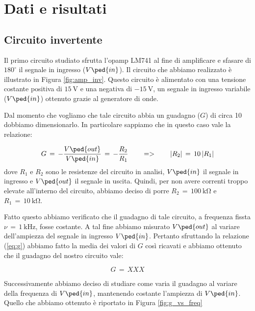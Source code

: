 \section*{Dati e risultati}

\subsection*{Circuito invertente}

Il primo circuito studiato sfrutta l'opamp LM741 al fine di amplificare e sfasare di $180^\circ$ il segnale in ingresso ($V\ped{in}$). Il circuito che abbiamo realizzato è illustrato in Figura \ref{fig:amp_inv}.
Questo circuito è alimentato con una tensione costante positiva di $\SI{+15}{\volt}$ e una negativa di $\SI{-15}{\volt}$, un segnale in ingresso variabile ($V\ped{in}$) ottenuto grazie al generatore di onde.

Dal momento che vogliamo che tale circuito abbia un guadagno ($G$) di circa 10 dobbiamo dimensionarlo. In particolare sappiamo che in questo caso vale la relazione:

\begin{equation}
        G\,=\,-\frac{V\ped{out}}{V\ped{in}}\,=\,-\frac{R_2}{R_1} \qquad => \qquad |R_2|\,=\,10\,|R_1|
        \label{eq:g}
\end{equation}
%
dove $R_1$ e $R_2$ sono le resistenze del circuito in analisi, $V\ped{in}$ il segnale in ingresso e $V\ped{out}$ il segnale in uscita. Quindi, per non avere correnti troppo elevate all'interno del circuito, abbiamo deciso di porre $R_2\,=\,\SI{100}{\kilo\ohm}$ e $R_1\,=\,\SI{10}{\kilo\ohm}$.

Fatto questo abbiamo verificato che il guadagno di tale circuito, a frequenza fissta $\nu\,=\,\SI{1}{\kilo\hertz}$, fosse costante. A tal fine abbiamo misurato $V\ped{out}$ al variare dell'ampiezza del segnale in ingresso $V\ped{in}$. Pertanto sfruttando la relazione (\ref{eq:g}) abbiamo fatto la media dei valori di $G$ così ricavati e abbiamo ottenuto che il guadagno del nostro circuito vale:

\begin{equation}
        G\,=\, XXX
\end{equation}

Successivamente abbiamo deciso di studiare come varia il guadagno al variare della frequenza di $V\ped{in}$, mantenendo costante l'ampiezza di $V\ped{in}$. Quello che abbiamo ottenuto è riportato in Figura \ref{fig:g_vs_freq}

